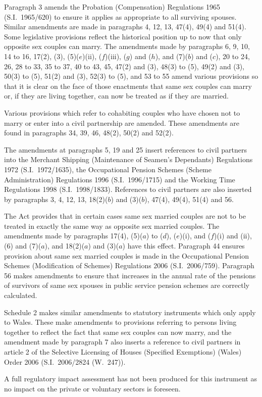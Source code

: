 \documentclass[12pt,a4paper]{article}
\begin{document}
Paragraph 3 amends the Probation (Compensation) Regulations 1965 (S.I.\ 1965/620) to ensure it applies as appropriate to all surviving spouses. Similar amendments are made in paragraphs 4, 12, 13, 47(4), 49(4) and 51(4). Some legislative provisions reflect the historical position up to now that only opposite sex couples can marry. The amendments made by paragraphs 6, 9, 10, 14 to 16, 17(2), (3), (5)($e$)(ii), ($f$)(iii), ($g$)  and ($h$), and (7)($b$)  and ($c$), 20 to 24, 26, 28 to 33, 35 to 37, 40 to 43, 45, 47(2) and (3), 48(3) to (5), 49(2) and (3), 50(3) to (5), 51(2) and (3), 52(3) to (5), and 53 to 55 amend various provisions so that it is clear on the face of those enactments that same sex couples can marry or, if they are living together, can now be treated as if they are married.

Various provisions which refer to cohabiting couples who have chosen not to marry or enter into a civil partnership are amended. These amendments are found in paragraphs 34, 39, 46, 48(2), 50(2) and 52(2).

The amendments at paragraphs 5, 19 and 25 insert references to civil partners into the Merchant Shipping (Maintenance of Seamen’s Dependants) Regulations 1972 (S.I.~1972/1635), the Occupational Pension Schemes (Scheme Administration) Regulations 1996 (S.I.~1996/1715) and the Working Time Regulations 1998 (S.I.~1998/1833). References to civil partners are also inserted by paragraphs 3, 4, 12, 13, 18(2)($b$)  and (3)($b$), 47(4), 49(4), 51(4) and 56.

The Act provides that in certain cases same sex married couples are not to be treated in exactly the same way as opposite sex married couples. The amendments made by paragraphs 17(4), (5)($a$)  to ($d$), ($e$)(i), and ($f$)(i)  and (ii), (6) and (7)($a$), and 18(2)($a$)  and (3)($a$)  have this effect. Paragraph 44 ensures provision about same sex married couples is made in the Occupational Pension Schemes (Modification of Schemes) Regulations 2006 (S.I.~2006/759). Paragraph 56 makes amendments to ensure that increases in the annual rate of the pensions of survivors of same sex spouses in public service pension schemes are correctly calculated.

Schedule 2 makes similar amendments to statutory instruments which only apply to Wales. These make amendments to provisions referring to persons living together to reflect the fact that same sex couples can now marry, and the amendment made by paragraph 7 also inserts a reference to civil partners in article 2 of the Selective Licensing of Houses (Specified Exemptions) (Wales) Order 2006 (S.I.~2006/2824 (W.~247)).

A full regulatory impact assessment has not been produced for this instrument as no impact on the private or voluntary sectors is foreseen. 
\end{document}
